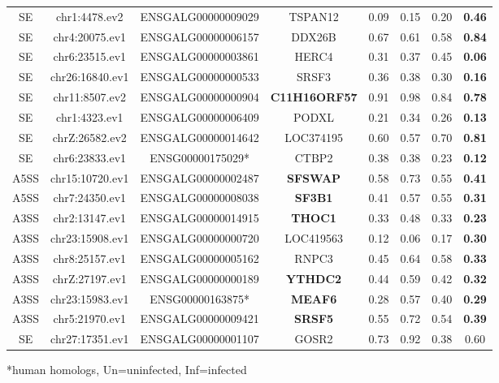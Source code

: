 \documentclass[10pt]{article}
\begin{document}
\begin{table}[!ht]
\begin{tabular}{cccccccc}
SE & chr1:4478.ev2 & ENSGALG00000009029 & TSPAN12 & 0.09 & 0.15 & 0.20 & \textbf{0.46} \\
SE & chr4:20075.ev1 & ENSGALG00000006157 & DDX26B & 0.67 & 0.61 & 0.58 & \textbf{0.84} \\
SE & chr6:23515.ev1 & ENSGALG00000003861 & HERC4 & 0.31 & 0.37 & 0.45 & \textbf{0.06} \\
SE & chr26:16840.ev1 & ENSGALG00000000533 & SRSF3 & 0.36 & 0.38 & 0.30 & \textbf{0.16} \\
SE & chr11:8507.ev2 & ENSGALG00000000904 & \textbf{C11H16ORF57} & 0.91 & 0.98 & 0.84 & \textbf{0.78} \\
SE & chr1:4323.ev1 & ENSGALG00000006409 & PODXL & 0.21 & 0.34 & 0.26 & \textbf{0.13} \\
SE & chrZ:26582.ev2 & ENSGALG00000014642 & LOC374195 & 0.60 & 0.57 & 0.70 & \textbf{0.81} \\
SE & chr6:23833.ev1 & ENSG00000175029* & CTBP2 & 0.38 & 0.38 & 0.23 & \textbf{0.12} \\
A5SS & chr15:10720.ev1 & ENSGALG00000002487 & \textbf{SFSWAP} & 0.58 & 0.73 & 0.55 & \textbf{0.41} \\
A5SS & chr7:24350.ev1 & ENSGALG00000008038 & \textbf{SF3B1} & 0.41 & 0.57 & 0.55 & \textbf{0.31} \\
A3SS & chr2:13147.ev1 & ENSGALG00000014915 & \textbf{THOC1} & 0.33 & 0.48 & 0.33 & \textbf{0.23} \\
A3SS & chr23:15908.ev1 & ENSGALG00000000720 & LOC419563 & 0.12 & 0.06 & 0.17 & \textbf{0.30} \\
A3SS & chr8:25157.ev1 & ENSGALG00000005162 & RNPC3 & 0.45 & 0.64 & 0.58 & \textbf{0.33} \\
A3SS & chrZ:27197.ev1 & ENSGALG00000000189 & \textbf{YTHDC2} & 0.44 & 0.59 & 0.42 & \textbf{0.32} \\
A3SS & chr23:15983.ev1 & ENSG00000163875* & \textbf{MEAF6} & 0.28 & 0.57 & 0.40 & \textbf{0.29} \\
A3SS & chr5:21970.ev1 & ENSGALG00000009421 & \textbf{SRSF5} & 0.55 & 0.72 & 0.54 & \textbf{0.39} \\
\hline
SE & chr27:17351.ev1 & ENSGALG00000001107 & GOSR2 & 0.73 & 0.92 & 0.38 & 0.60 \\
\hline
\end{tabular}
\begin{flushleft}
    *human homologs, Un=uninfected, Inf=infected
\end{flushleft}
\label{tab:line67i_diff_line67u}
\end{table}
\end{document}
